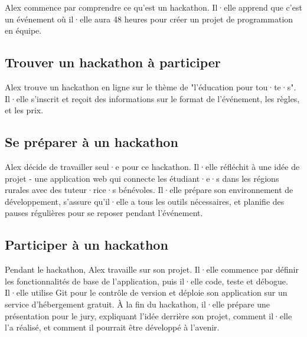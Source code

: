 Alex commence par comprendre ce qu'est un hackathon. Il·elle apprend que c'est un événement où il·elle aura 48 heures pour créer un projet de programmation en équipe.

\subsection{Trouver un hackathon à participer}

Alex trouve un hackathon en ligne sur le thème de "l'éducation pour tou·te·s". Il·elle s'inscrit et reçoit des informations sur le format de l'événement, les règles, et les prix.

\subsection{Se préparer à un hackathon}

Alex décide de travailler seul·e pour ce hackathon. Il·elle réfléchit à une idée de projet - une application web qui connecte les étudiant·e·s dans les régions rurales avec des tuteur·rice·s bénévoles. Il·elle prépare son environnement de développement, s'assure qu'il·elle a tous les outils nécessaires, et planifie des pauses régulières pour se reposer pendant l'événement.

\subsection{Participer à un hackathon}

Pendant le hackathon, Alex travaille sur son projet. Il·elle commence par définir les fonctionnalités de base de l'application, puis il·elle code, teste et débogue. Il·elle utilise Git pour le contrôle de version et déploie son application sur un service d'hébergement gratuit. À la fin du hackathon, il·elle prépare une présentation pour le jury, expliquant l'idée derrière son projet, comment il·elle l'a réalisé, et comment il pourrait être développé à l'avenir.

